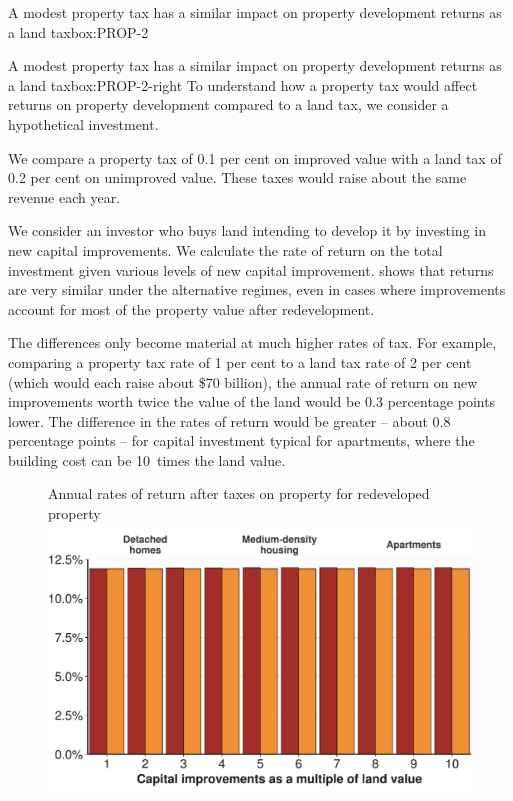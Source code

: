 \documentclass[twoside,english]{grattanBudgetRepairb5portrait}
\begin{document}
{\begin{lultrabox}{A modest property tax has a similar impact on property \newline development returns as a land tax}{box:PROP-2}
\begin{figure}[H]
\end{figure}%
\end{lultrabox}
\begin{rultrabox}{A modest property tax has a similar impact on property \newline development returns as a land tax}{box:PROP-2-right}
To understand how a property tax would affect returns on property development compared to a land tax, we consider a hypothetical investment.

We compare a property tax of 0.1 per cent on improved value with a land tax of 0.2 per cent on unimproved value. These taxes would raise about the same revenue each year. 

We consider an investor who buys land intending to develop it by investing in new capital improvements. We calculate the rate of return on the total investment given various levels of new capital improvement.  shows that returns are very similar under the alternative regimes, even in cases where improvements account for most of the property value after redevelopment. 

The differences only become material at much higher rates of tax. For example, comparing a property tax rate of 1 per cent to a land tax rate of 2 per cent (which would each raise about \$70 billion), the annual rate of return on new improvements worth twice the value of the land would be 0.3 percentage points lower. The difference in the rates of return would be greater – about 0.8 percentage points – for capital investment typical for apartments, where the building cost can be 10~times the land value.

\begin{figure}[H]
%
{Annual rates of return after taxes on property for redeveloped property}
\includegraphics[width=\linewidth]{Property-taxes/atlas/figure/Figure9-1.pdf}

\end{figure}%
\end{rultrabox}
}
\end{document}
